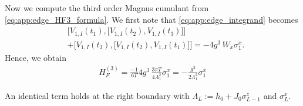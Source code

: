 \documentclass[aps,prb,reprint,twocolumn,amsmath,amssymb,citeautoscript]{revtex4-2}
\begin{document}
Now we compute the third order Magnus cumulant from \eqref{eq:app:edge_HF3_formula}. We first note that \eqref{eq:app:edge_integrand} becomes \begin{equation}
\begin{aligned}
    &\bigl[V_{1,I}(t_1),\bigl[V_{1,I}(t_2),V_{1,I}(t_3)\bigr]\bigr]\\
&+\bigl[V_{1,I}(t_3),\bigl[V_{1,I}(t_2),V_{1,I}(t_1)\bigr]\bigr]
=-4g^3\,
W_x\sigma_1^x.
\end{aligned}
\end{equation}
Hence, we obtain
\begin{equation}
    \begin{aligned}
H_F^{(3)}
=\frac{-1}{6T}4g^3\,
\frac{3\pi T}{4\Lambda_1^2}\sigma_1^x = -\frac{g^3 }{2\Lambda_1^2}\sigma_1^x
\label{}
\end{aligned}
\label{eq:app:edge_HF3_final}
\end{equation}

An identical term holds at the right boundary with
$\Lambda_L:=h_0+J_0\sigma_{L-1}^z$ and $\sigma_L^x$.
\end{document}
